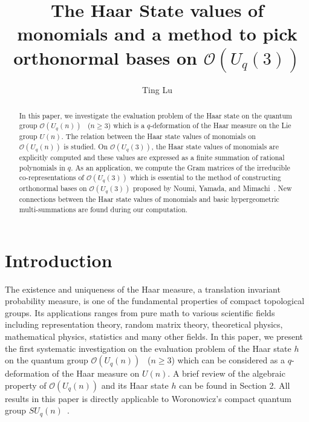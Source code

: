 \documentclass[table,a4paper,reqno]{amsart}
\numberwithin{equation}{section}
\theoremstyle{definition}
\begin{document}
\title[The Haar State values of monomials on $\mathcal{O}(U_q(3))$]{The Haar State values of monomials and a method to pick orthonormal bases on $\mathcal{O}(U_q(3))$}
\author{Ting Lu}
\address{Ting Lu, Institute for Advanced Study in Mathematics, Harbin Institute of Technology, Harbin, Heilongjiang Province, China}

\begin{abstract}
    In this paper, we investigate the evaluation problem of the Haar state on the quantum group $\mathcal{O}(U_q(n))$~\cite{faddeev1988quantization,klimyk2012quantum} ($n\ge 3$) which is a $q$-deformation of the Haar measure on the Lie group $U(n)$. The relation between the Haar state values of monomials on $\mathcal{O}(U_q(n))$ is studied. On $\mathcal{O}(U_q(3))$, the Haar state values of monomials are explicitly computed and these values are expressed as a finite summation of rational polynomials in $q$. As an application, we compute the Gram matrices of the irreducible co-representations of $\mathcal{O}(U_q(3))$ which is essential to the method of constructing orthonormal bases on $\mathcal{O}(U_q(3))$ proposed by Noumi, Yamada, and Mimachi~\cite{noumi1993finite}. New connections between the Haar state values of monomials and basic hypergeometric multi-summations are found during our computation.
\end{abstract}
\maketitle

\setcounter{tocdepth}{2}

\tableofcontents

\section{Introduction}
 The existence and uniqueness of the Haar measure, a translation invariant probability measure, is one of the fundamental properties of compact topological groups. Its applications ranges from pure math to various scientific fields including representation theory, random matrix theory, theoretical physics, mathematical physics, statistics and many other fields. In this paper, we present the first systematic investigation on the evaluation problem of the Haar state $h$ on the quantum group $\mathcal{O}(U_q(n))$~\cite{faddeev1988quantization,klimyk2012quantum} ($n\ge 3$) which can be considered as a $q$-deformation of the Haar measure on $U(n)$. A brief review of the algebraic property of $\mathcal{O}(U_q(n))$ and its Haar state $h$ can be found in Section 2. All results in this paper is directly applicable to Woronowicz's compact quantum group $SU_q(n)$~\cite{woronowicz1988tannaka,woronowicz1987compact}.
 
\end{document}
